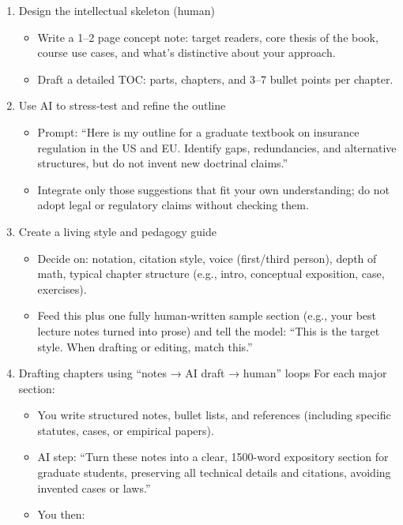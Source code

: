 \documentclass[
  11pt,
]{article}
\providecommand{\tightlist}{%
  \setlength{\itemsep}{0pt}\setlength{\parskip}{0pt}}
\begin{document}
\begin{enumerate}
\def\labelenumi{\arabic{enumi}.}
\tightlist
\item
  Design the intellectual skeleton (human)

  \begin{itemize}
  \tightlist
  \item
    Write a 1--2 page concept note: target readers, core thesis of the book, course use cases, and what's distinctive about your approach.
  \item
    Draft a detailed TOC: parts, chapters, and 3--7 bullet points per chapter.
  \end{itemize}
\item
  Use AI to stress‑test and refine the outline

  \begin{itemize}
  \tightlist
  \item
    Prompt: ``Here is my outline for a graduate textbook on insurance regulation in the US and EU. Identify gaps, redundancies, and alternative structures, but do not invent new doctrinal claims.''
  \item
    Integrate only those suggestions that fit your own understanding; do not adopt legal or regulatory claims without checking them.
  \end{itemize}
\item
  Create a living style and pedagogy guide

  \begin{itemize}
  \tightlist
  \item
    Decide on: notation, citation style, voice (first/third person), depth of math, typical chapter structure (e.g., intro, conceptual exposition, case, exercises).
  \item
    Feed this plus one fully human‑written sample section (e.g., your best lecture notes turned into prose) and tell the model: ``This is the target style. When drafting or editing, match this.''
  \end{itemize}
\item
  Drafting chapters using ``notes → AI draft → human'' loops For each major section:

  \begin{itemize}
  \tightlist
  \item
    You write structured notes, bullet lists, and references (including specific statutes, cases, or empirical papers).
  \item
    AI step: ``Turn these notes into a clear, 1500-word expository section for graduate students, preserving all technical details and citations, avoiding invented cases or laws.''
  \item
    You then:


\end{itemize}
\end{enumerate}
\end{document}
